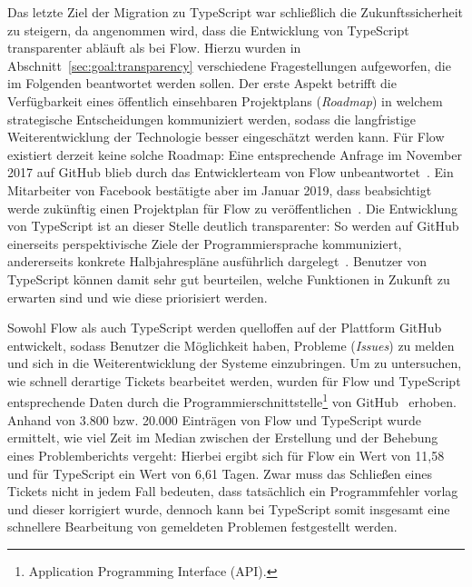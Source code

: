 Das letzte Ziel der Migration zu TypeScript war schließlich die Zukunftssicherheit zu steigern, da angenommen wird, dass die Entwicklung von TypeScript transparenter abläuft als bei Flow. Hierzu wurden in Abschnitt~\ref{sec:goal:transparency} verschiedene Fragestellungen aufgeworfen, die im Folgenden beantwortet werden sollen.
Der erste Aspekt betrifft die Verfügbarkeit eines öffentlich einsehbaren Projektplans (\textit{Roadmap}) in welchem strategische Entscheidungen kommuniziert werden, sodass die langfristige Weiterentwicklung der Technologie besser eingeschätzt werden kann. Für Flow existiert derzeit keine solche Roadmap: Eine entsprechende Anfrage im November 2017 auf GitHub blieb durch das Entwicklerteam von Flow unbeantwortet~\autocite{FLOW:GITHUB:ROADMAP}. Ein Mitarbeiter von Facebook bestätigte aber im Januar 2019, dass beabsichtigt werde zukünftig einen Projektplan für Flow zu veröffentlichen~\autocite{FLOW:GITHUB:ROADMAP_FUTURE}. Die Entwicklung von TypeScript ist an dieser Stelle deutlich transparenter: So werden auf GitHub einerseits perspektivische Ziele der Programmiersprache kommuniziert, andererseits konkrete Halbjahrespläne ausführlich dargelegt~\autocite{TS:ROADMAP}. Benutzer von TypeScript können damit sehr gut beurteilen, welche Funktionen in Zukunft zu erwarten sind und wie diese priorisiert werden.

Sowohl Flow als auch TypeScript werden quelloffen auf der Plattform GitHub entwickelt, \linebreak sodass Benutzer die Möglichkeit haben, Probleme (\textit{Issues}) zu melden und sich in die Weiterentwicklung der Systeme einzubringen. Um zu untersuchen, wie schnell derartige Tickets bearbeitet werden, wurden für Flow und TypeScript entsprechende Daten durch die Programmierschnittstelle\footnote{Application Programming Interface (API).} von GitHub~\autocite{GITHUB:API} erhoben. Anhand von 3.800 bzw. 20.000 Einträgen von Flow und TypeScript wurde ermittelt, wie viel Zeit im Median zwischen der Erstellung und der Behebung eines Problemberichts vergeht: Hierbei ergibt sich für Flow ein Wert von 11,58 und für TypeScript ein Wert von 6,61 Tagen. Zwar muss das Schließen eines Tickets nicht in jedem Fall bedeuten, dass tatsächlich ein Programmfehler vorlag und dieser korrigiert wurde, dennoch kann bei TypeScript somit insgesamt eine schnellere Bearbeitung von gemeldeten Problemen festgestellt werden.

